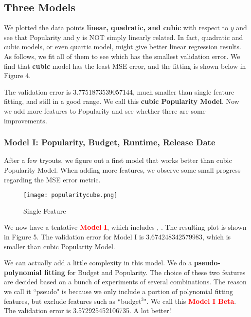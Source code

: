 \documentclass[12pt]{article}
\begin{document}
\subsection{Three Models}
We plotted the data points \textbf{linear, quadratic, and cubic} with respect to $y$ and see that Popularity and y is NOT simply linearly related. In fact, quadratic and cubic models, or even quartic model, might give better linear regression results. As follows, we fit all of them to see which has the smallest validation error. We find that \textbf{cubic} model has the least MSE error, and the fitting is shown below in Figure 4.
\par The validation error is 3.7751873539057144, much smaller than single feature fitting, and still in a good range. We call this \textbf{cubic Popularity Model}. Now we add more features to Popularity and see whether there are some improvements.
\subsubsection{Model I: Popularity, Budget, Runtime, Release Date}
After a few tryouts, we figure out a first model that works better than cubic Popularity Model. When adding more features, we observe some small progress regarding the MSE error metric. 
\begin{wrapfigure}{L}{0.3\textwidth}
\centering
\texttt{[image: popularitycube.png]}
\caption{Single Feature}
\end{wrapfigure}\par
We now have a tentative \textbf{\textcolor{red}{Model I}}, which includes , . The resulting plot is shown in Figure 5. The validation error for Model I is 3.674248342579983, which is smaller than cubic Popularity Model.\par We can actually add a little complexity in this model. We do a \textbf{pseudo-polynomial fitting} for Budget and Popularity. The choice of these two features are decided based on a bunch of experiments of several combinations. The reason we call it ``pseudo" is because we only include a portion of polynomial fitting features, but exclude features such as ``budget$^3$". We call this \textbf{\textcolor{red}{Model I Beta}}. The validation error is 3.572925452106735. A lot better!
\end{document}
